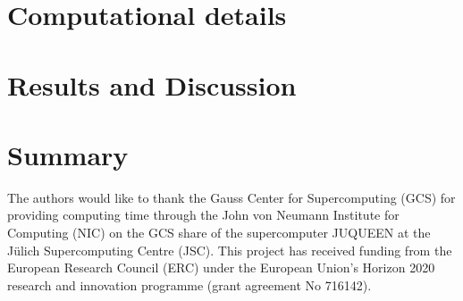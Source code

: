 \documentclass[aps,pre,twocolumn,showpacs,preprintnumbers,amsmath,amssymb]{revtex4-1}
\begin{document}
\section{Computational details}

 
\section{Results and Discussion}


\section{Summary}



\begin{acknowledgments}
The authors would like to thank the Gauss Center for Supercomputing (GCS) for providing computing time through the John von Neumann Institute for Computing (NIC) on the GCS share of the supercomputer JUQUEEN at the J\"ulich Supercomputing Centre (JSC). This project has received funding from the European Research Council (ERC) under the European Union's Horizon 2020 research and innovation programme (grant agreement No 716142).
\end{acknowledgments}



\end{document}
